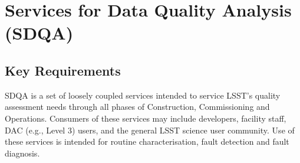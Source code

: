 \section{Services for Data Quality Analysis (SDQA)}
\label{sec:sdqa}

\subsection{Key Requirements}

SDQA is a set of loosely coupled services intended to service LSST's quality assessment needs through all phases of Construction, Commissioning and Operations. Consumers of these services may include developers, facility staff, DAC (e.g., Level 3) users, and the general LSST science user community. Use of these services is intended for routine characterisation, fault detection and fault diagnosis.

